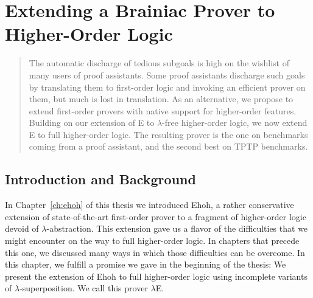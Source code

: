 \chapter{Extending a Brainiac Prover to Higher-Order Logic}
\label{ch:ehoh2}

\newcommand\ehohii{$\lambda$E}



\begin{abstract}%
    The automatic discharge of tedious subgoals is high on the wishlist of many
  users of proof assistants. Some proof assistants discharge such goals
  by translating them to first-order logic and invoking an efficient prover on
  them, but much is lost in translation. As an alternative,
  we propose to extend first-order provers with native support for
  higher-order features. Building on our extension of E to $\lambda$-free
  higher-order logic, we now extend E to full higher-order logic.
  The resulting prover is the  one on benchmarks coming from a
  proof assistant, and the second best on TPTP benchmarks.
\end{abstract}

\newpage

\section{Introduction and Background}
\label{sec:ehoh2:introduction}

In Chapter~\ref{ch:ehoh} of this thesis we introduced Ehoh, a rather conservative extension of
state-of-the-art first-order prover to a fragment of higher-order logic devoid of $\lambda$-abstraction. This
extension gave us a flavor of the difficulties that we might encounter on the
way to full higher-order logic. In chapters that precede this one,
we discussed many ways in which those difficulties can be overcome.
In this chapter, we fulfill a promise we gave in the beginning of the thesis: We present the extension of
Ehoh to full higher-order logic using incomplete variants
of $\lambda$-superposition. We call this prover \ehohii.

